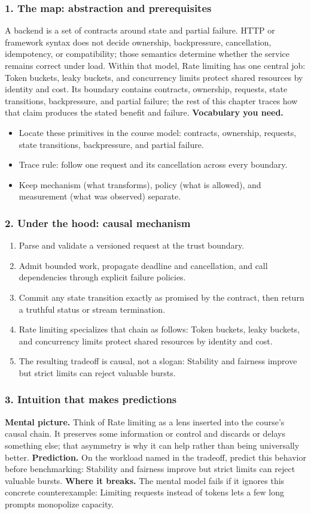 \subsubsection*{1. The map: abstraction and prerequisites}
A backend is a set of contracts around state and partial failure. HTTP or framework syntax does not decide ownership, backpressure, cancellation, idempotency, or compatibility; those semantics determine whether the service remains correct under load.
Within that model, Rate limiting has one central job: Token buckets, leaky buckets, and concurrency limits protect shared resources by identity and cost. Its boundary contains contracts, ownership, requests, state transitions, backpressure, and partial failure; the rest of this chapter traces how that claim produces the stated benefit and failure.
\textbf{Vocabulary you need.}\begin{itemize}
\item Locate these primitives in the course model: contracts, ownership, requests, state transitions, backpressure, and partial failure.
\item Trace rule: follow one request and its cancellation across every boundary.
\item Keep mechanism (what transforms), policy (what is allowed), and measurement (what was observed) separate.
\end{itemize}
\subsubsection*{2. Under the hood: causal mechanism}\begin{enumerate}
\item Parse and validate a versioned request at the trust boundary.
\item Admit bounded work, propagate deadline and cancellation, and call dependencies through explicit failure policies.
\item Commit any state transition exactly as promised by the contract, then return a truthful status or stream termination.
\item Rate limiting specializes that chain as follows: Token buckets, leaky buckets, and concurrency limits protect shared resources by identity and cost.
\item The resulting tradeoff is causal, not a slogan: Stability and fairness improve but strict limits can reject valuable bursts.
\end{enumerate}
\subsubsection*{3. Intuition that makes predictions}
\textbf{Mental picture.} Think of Rate limiting as a lens inserted into the course's causal chain. It preserves some information or control and discards or delays something else; that asymmetry is why it can help rather than being universally better.
\textbf{Prediction.} On the workload named in the tradeoff, predict this behavior before benchmarking: Stability and fairness improve but strict limits can reject valuable bursts.
\textbf{Where it breaks.} The mental model fails if it ignores this concrete counterexample: Limiting requests instead of tokens lets a few long prompts monopolize capacity.
